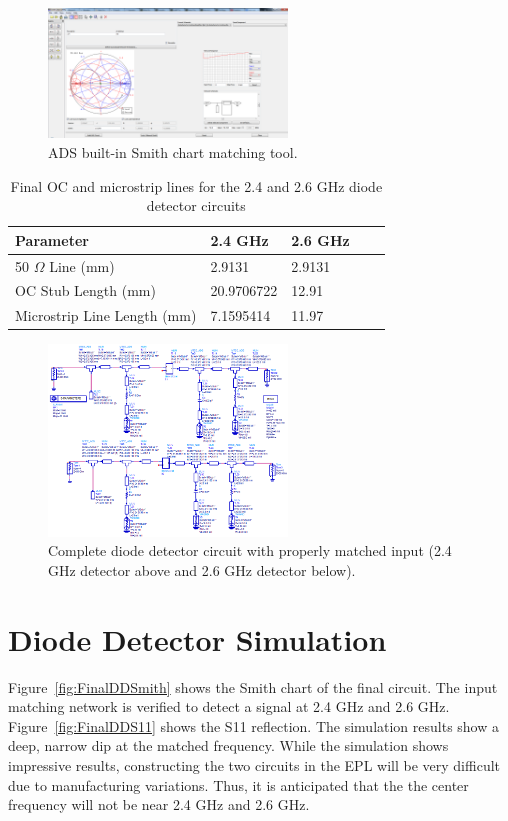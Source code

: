 \documentclass[conference]{IEEEtran}
\begin{document}
\begin{figure}[!htb]
\centering
\includegraphics[width=2.5in]{diode-pics/smithcharttool.png}
\caption{ADS built-in Smith chart matching tool.}
\label{fig:smithchartTool}
\end{figure}

\begin{table}
\caption{Final OC and microstrip lines for the 2.4 and 2.6 GHz diode detector circuits}
\begin{tabular}{|l|l|l|l|l}
\hline
Parameter & 2.4 GHz & 2.6 GHz \\ \hline
50 $\Omega$ Line (mm) & 2.9131 & 2.9131 \\ \hline
OC Stub Length (mm) & 20.9706722 & 12.91 \\ \hline
Microstrip Line Length (mm) & 7.1595414 & 11.97 \\ \hline
\end{tabular}
\label{tab:diodetable}
\end{table}

\begin{figure}[!htb]
\centering
\includegraphics[width=2.5in]{diode-pics/diodedetectorsfinalchematic.png}
\caption{Complete diode detector circuit with properly matched input (2.4 GHz detector above and 2.6 GHz detector below).}
\label{fig:FinalDDSchematic}
\end{figure}

\section{Diode Detector Simulation}
Figure~\ref{fig:FinalDDSmith} shows the Smith chart of the final circuit. The input matching network is verified to detect a signal at 2.4 GHz and 2.6 GHz. Figure~\ref{fig:FinalDDS11} shows the S11 reflection. The simulation results show a deep, narrow dip at the matched frequency. While the simulation shows impressive results, constructing the two circuits in the EPL will be very difficult due to manufacturing variations. Thus, it is anticipated that the the center frequency will not be near 2.4 GHz and 2.6 GHz.
\end{document}
